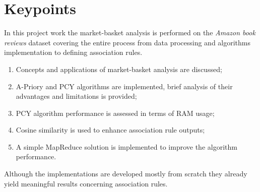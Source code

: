 % 
% 
\chapter{Keypoints}
\label{chap:keypoints}

In this project work the market-basket analysis is performed on the \textit{Amazon book reviews} dataset covering the entire process from data processing and algorithms implementation to defining association rules.
\newline
\begin{enumerate}
	\item Concepts and applications of market-basket analysis are discussed;
	\item A-Priory and PCY algorithms are implemented, brief analysis of their advantages and limitations is provided;
	\item PCY algorithm performance is assessed in terms of RAM usage;
	\item Cosine similarity is used to enhance association rule outputs;
	\item A simple MapReduce solution is implemented to improve the algorithm performance.
\end{enumerate}

Although the implementations are developed mostly from scratch they already yield meaningful results concerning association rules.

